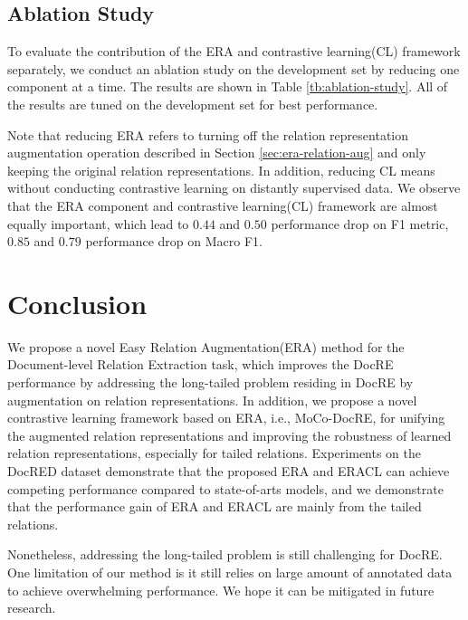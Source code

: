 \documentclass[11pt]{article}
\begin{document}
    
    
    
    
    
\subsection{Ablation Study}
    To evaluate the contribution of the ERA and contrastive learning(CL) framework separately, we conduct an ablation study on the development set by reducing one component at a time. The results are shown in Table \ref{tb:ablation-study}. All of the results are tuned on the development set for best performance. 
    
    Note that reducing ERA refers to turning off the relation representation augmentation operation described in Section \ref{sec:era-relation-aug} and only keeping the original relation representations. In addition, reducing CL means without conducting contrastive learning on distantly supervised data. We observe that the ERA component and contrastive learning(CL) framework are almost equally important, which lead to $0.44$ and $0.50$ performance drop on F1 metric, $0.85$ and $0.79$ performance drop on Macro F1.
    
\section{Conclusion}
   We propose a novel Easy Relation Augmentation(ERA) method for the Document-level Relation Extraction task, which improves the DocRE performance by addressing the long-tailed problem residing in DocRE by augmentation on relation representations. In addition, we propose a novel contrastive learning framework based on ERA, i.e., MoCo-DocRE, for unifying the augmented relation representations and improving the robustness of learned relation representations, especially for tailed relations. Experiments on the DocRED dataset demonstrate that the proposed ERA and ERACL can achieve competing performance compared to state-of-arts models, and we demonstrate that the performance gain of ERA and ERACL are mainly from the tailed relations.
    
    Nonetheless, addressing the long-tailed problem is still challenging for DocRE. One limitation of our method is it still relies on large amount of annotated data to achieve overwhelming performance. We hope it can be mitigated in future research.










































\end{document}
